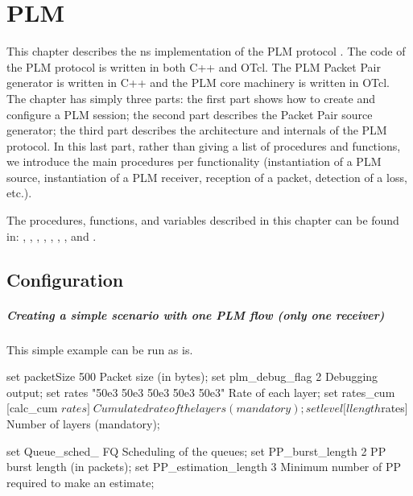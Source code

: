 \chapter{PLM}
{\sloppy
\label{sec:PLM}
This chapter describes the ns  implementation of the PLM protocol
\cite{legout_sigmetrics2000}. The code of the PLM 
protocol  is written in both C++ and OTcl. The PLM Packet Pair generator is
written in C++ and the PLM core machinery is written in OTcl. The chapter has simply
three parts: the first part shows how to create and configure a PLM session; the
second part describes the Packet Pair source generator; the third part describes
the architecture and internals of the PLM protocol. In this last part, rather
than giving a list of procedures and functions, we introduce the main
procedures per functionality (instantiation of a PLM source, instantiation of a
PLM receiver, reception of a packet, detection of a loss, etc.).

The procedures, functions, and variables described in this chapter can be found in:
, , ,
, ,
, , and .

\section{Configuration}
\label{sec:Configuration}
\paragraph{Creating a simple scenario with one PLM flow (only one receiver)\\}
This simple example can be run as is.

\begin{program}
  set packetSize 500                          \;Packet size (in bytes);
  set plm_debug_flag 2                        \;Debugging output;
  set rates "50e3 50e3 50e3 50e3 50e3"        \;Rate of each layer;
  set rates_cum [calc_cum $rates]       \;Cumulated rate of the layers (mandatory);
  set level [llength $rates]            \;Number of layers (mandatory);
  
  set Queue_sched_ FQ                         \;Scheduling of the queues;
  set PP_burst_length 2                       \;PP burst length (in packets);
  set PP_estimation_length 3                  \;Minimum number of PP required to make an estimate;


\end{program}}
